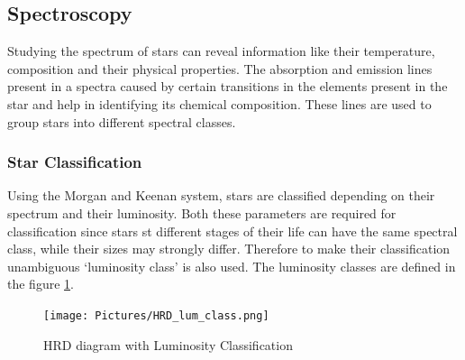 \documentclass[12pt,a4paper]{article}
\begin{document}
  \subsection{Spectroscopy}
  \label{sec:spectroscopy}
    Studying the spectrum of stars can reveal information like their temperature, composition and their physical properties. The absorption and emission lines present 
    in a spectra caused by certain transitions in the elements present in the star and help in identifying its chemical composition. These lines are used to group
    stars into different spectral classes. \\

    \subsubsection{Star Classification}
    Using the Morgan and Keenan system, stars are classified depending on their spectrum and their luminosity. Both these parameters are required for classification since 
    stars st different stages of their life can have the same spectral class, while their sizes may strongly differ. Therefore to make their classification unambiguous `luminosity class' 
    is also used. The luminosity classes are defined in the figure \ref{fig:MK}.
    \begin{figure}[H]
      \centering
      \texttt{[image: Pictures/HRD\_lum\_class.png]}
      \caption{HRD diagram with Luminosity Classification}
      \label{fig:MK}
    \end{figure}
\end{document}
